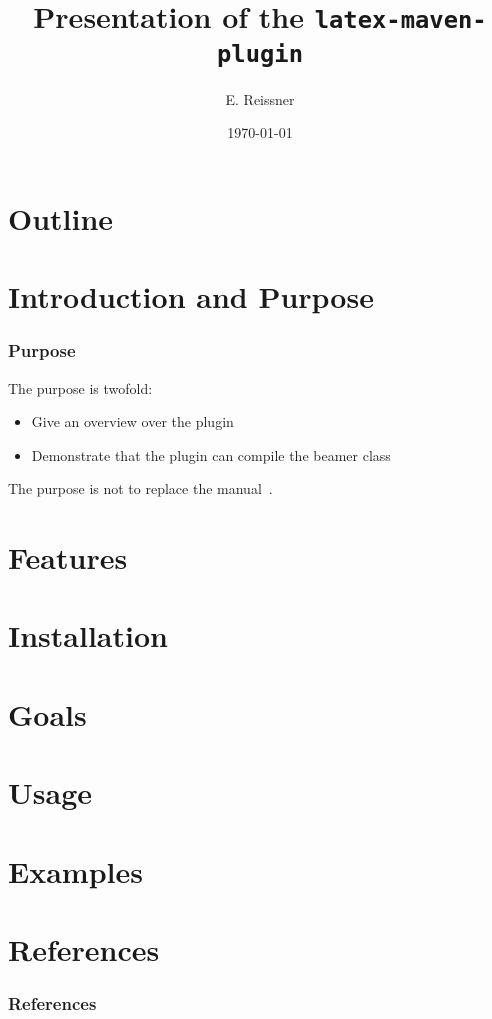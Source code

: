 \title{Presentation of the \texttt{latex-maven-plugin}}
\author{E. Reissner}
\date{\today}

\usepackage{xurl}




\begin{frame}
\titlepage%
\end{frame}

\section*{Outline}

\begin{frame}
\tableofcontents
\end{frame}

\section{Introduction and Purpose}

\begin{frame}
  \frametitle{Purpose}
  The purpose is twofold: 
  \begin{itemize}
    \item Give an overview over the plugin 
    \item Demonstrate that the plugin can compile the beamer class 
  \end{itemize}
  The purpose is not to replace the manual~\cite{LatexPlugin}. 
\end{frame}

\section{Features}

\section{Installation}

\section{Goals}

\section{Usage}

\section{Examples}

\section{References}


\begin{frame}[allowframebreaks]
  \frametitle{References}
  {}
\end{frame}

